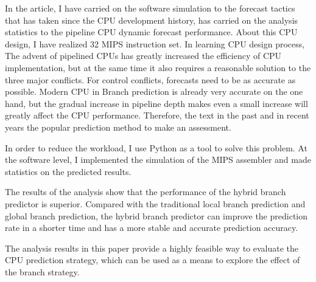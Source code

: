 \begin{enabstract}
  In the article, I have carried on the software simulation to the forecast tactics that has taken since the CPU development history, has carried on the analysis statistics to the pipeline CPU dynamic forecast performance. About this CPU design, I have realized 32 MIPS instruction set. In learning CPU design process,
  The advent of pipelined CPUs has greatly increased the efficiency of CPU implementation, but at the same time it also requires a reasonable solution to the three major conflicts. For control conflicts, forecasts need to be as accurate as possible. Modern CPU in
  Branch prediction is already very accurate on the one hand, but the gradual increase in pipeline depth makes even a small increase will greatly affect the CPU performance. Therefore, the text in the past and in recent years the popular prediction method to make an assessment. \par
  In order to reduce the workload, I use Python as a tool to solve this problem. At the software level, I implemented the simulation of the MIPS assembler and made statistics on the predicted results. \par
  The results of the analysis show that the performance of the hybrid branch predictor is superior. Compared with the traditional local branch prediction and global branch prediction, the hybrid branch predictor can improve the prediction rate in a shorter time and has a more stable and accurate prediction accuracy. \par
  The analysis results in this paper provide a highly feasible way to evaluate the CPU prediction strategy, which can be used as a means to explore the effect of the branch strategy.

\end{enabstract}
\par
\vspace*{2em}

